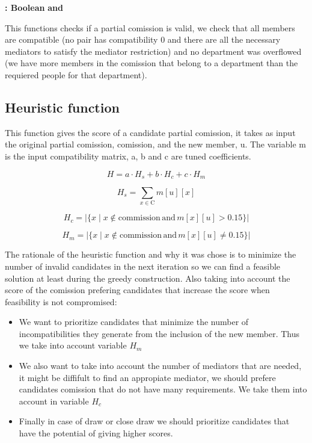 \documentclass{article}
\begin{document}
\begin{algorithm}[H]
\begin{algorithmic}[1]
 \textbf{: Boolean}
    \State \Return {} \textbf{and} 
\EndFunction
\end{algorithmic}
\end{algorithm}

This functions checks if a partial comission is valid, we check that all members are compatible (no pair has compatibility 0 and there are all the necessary mediators to satisfy the mediator restriction) and no department was overflowed (we have more members in the comission that belong to a department than the requiered people for that department).

\newpage
\subsection{Heuristic function}
This function gives the score of a candidate partial comission, it takes as input the original partial comission, comission, and the new member, u.
The variable m is the input compatibility matrix, a, b and c are tuned coefficients.

\[
H = a \cdot H_s + b \cdot H_c + c \cdot H_m
\]

\[
H_s = \sum_{x \in \text{C}} m[u][x]
\]

\[
H_c = \left| \{ x \mid x \notin \text{commission} \, \text{and} \, m[x][u] > 0.15 \} \right|
\]

\[
H_m = \left| \{ x \mid x \notin \text{commission} \, \text{and} \, m[x][u] \neq 0.15 \} \right|
\]

The rationale of the heuristic function and why it was chose is to minimize the number of invalid candidates in the next iteration so we can find a feasible solution at least during the greedy construction. Also taking into account the score of the comission prefering candidates that increase the score when feasibility is not compromised:

\begin{itemize}
  \item We want to prioritize candidates that minimize the number of incompatibilities they generate from the inclusion of the new member. Thus we take into account variable $H_m$
  \item We also want to take into account the number of mediators that are needed, it might be diffifult to find an appropiate mediator, we should prefere candidates comission that do not have many requirements. We take them into account in variable $H_c$
  \item Finally in case of draw or close draw we should prioritize candidates that have the potential of giving higher scores.
\end{itemize}
\end{document}
